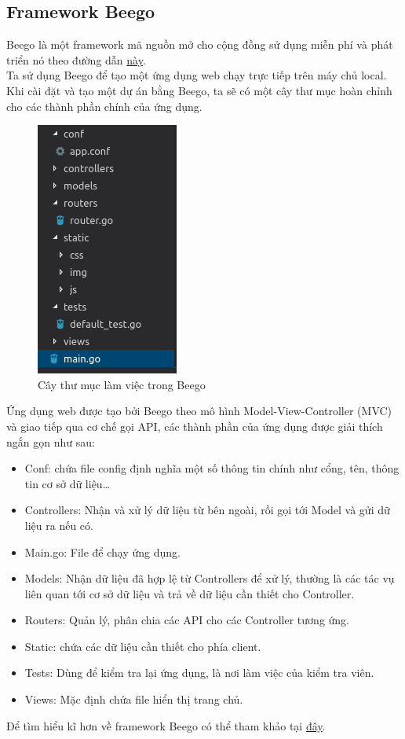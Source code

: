 \subsection{Framework Beego}
Beego là một framework mã nguồn mở cho cộng đồng sử dụng miễn phí và phát triển nó theo đường dẫn \href{https://github.com/astaxie/beego}{này}.\\
Ta sử dụng Beego để tạo một ứng dụng web chạy trực tiếp trên máy chủ local. Khi cài đặt và tạo một dự án bằng Beego, ta sẽ có một cây thư mục hoàn chỉnh cho các thành phần chính của ứng dụng.\\
\begin{figure}[h]
\centering
    \includegraphics[totalheight=7cm]{Images/app_beego_struct_folder.png}
    \caption{Cây thư mục làm việc trong Beego}
    \label{skip_conn}
\end{figure}
Ứng dụng web được tạo bởi Beego theo mô hình Model-View-Controller (MVC) và giao tiếp qua cơ chế gọi API, các thành phần của ứng dụng được giải thích ngắn gọn như sau:
\begin{itemize}
    \item Conf: chứa file config định nghĩa một số thông tin chính như cổng, tên, thông tin cơ sở dữ liệu…
    \item Controllers: Nhận và xử lý dữ liệu từ bên ngoài, rồi gọi tới Model và gửi dữ liệu ra nếu có.
    \item Main.go: File để chạy ứng dụng.
    \item Models: Nhận dữ liệu đã hợp lệ từ Controllers để xử lý, thường là các tác vụ liên quan tới cơ sở dữ liệu và trả về dữ liệu cần thiết cho Controller.
    \item Routers: Quản lý, phân chia các API cho các Controller tương ứng.
    \item Static: chứa các dữ liệu cần thiết cho phía client.
    \item Tests: Dùng để kiểm tra lại ứng dụng, là nơi làm việc của kiểm tra viên.
    \item Views: Mặc định chứa file hiển thị trang chủ.
\end{itemize}
Để tìm hiểu kĩ hơn về framework Beego có thể tham khảo tại \href{ https://beego.me/docs}{đây}.

